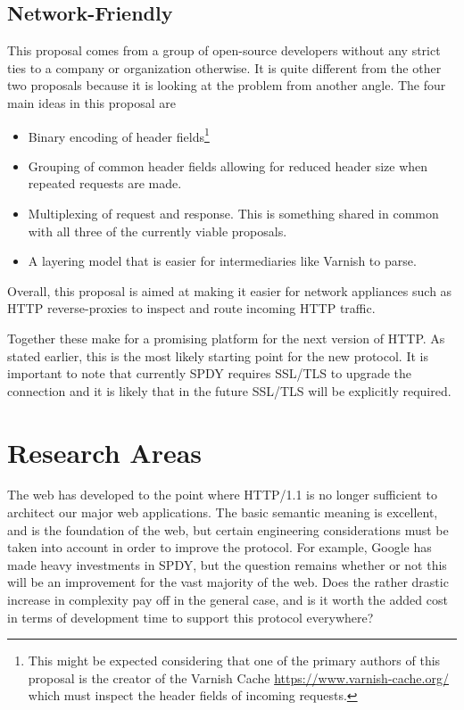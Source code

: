 \documentclass[11pt,letterpaper,notitlepage]{article}
\begin{document}
\subsection{Network-Friendly}
\label{sec:background/opensource}
This proposal comes from a group of open-source developers without any strict
ties to a company or organization otherwise.  It is quite different from the
other two proposals because it is looking at the problem from another angle.
The four main ideas in this proposal are~\cite{friendly}
\begin{itemize}
\item Binary encoding of header fields\footnote{This might be expected
considering that one of the primary authors of this proposal is the creator of
the Varnish Cache \url{https://www.varnish-cache.org/} which must inspect the
header fields of incoming requests.}
\item Grouping of common header fields allowing for reduced header size when
repeated requests are made.
\item Multiplexing of request and response.  This is something shared in common
with all three of the currently viable proposals.
\item A layering model that is easier for intermediaries like Varnish to parse.
\end{itemize}

Overall, this proposal is aimed at making it easier for network appliances such
as HTTP reverse-proxies to inspect and route incoming HTTP traffic.

Together these make for a promising platform for the next version of HTTP.  As
stated earlier, this is the most likely starting point for the new protocol. It
is important to note that currently SPDY requires SSL/TLS to upgrade the
connection and it is likely that in the future SSL/TLS will be explicitly
required.

\section{Research Areas}
\label{sec:research}
The web has developed to the point where HTTP/1.1 is no longer sufficient to
architect our major web applications. The basic semantic meaning is excellent,
and is the foundation of the web, but certain engineering considerations must
be taken into account in order to improve the protocol. For example, Google has
made heavy investments in SPDY, but the question remains whether or not this
will be an improvement for the vast majority of the web.  Does the rather
drastic increase in complexity pay off in the general case, and is it worth the
added cost in terms of development time to support this protocol everywhere?
\end{document}

